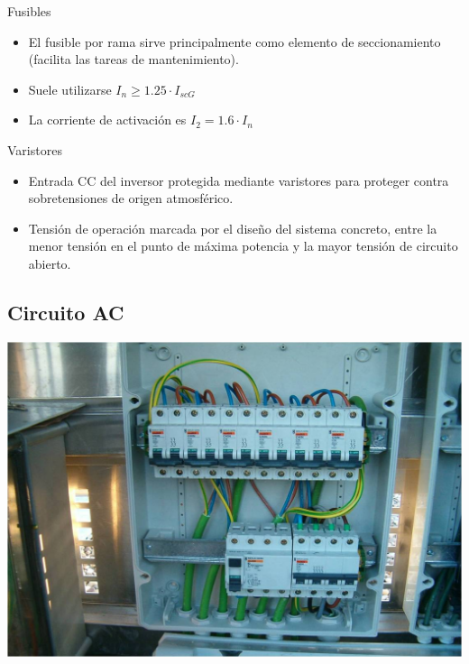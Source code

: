 \documentclass[xcolor={usenames,svgnames,dvipsnames}]{beamer}
\begin{document}
\begin{frame}[label={sec:orgc6a8b85}]{Fusibles}
\begin{itemize}
\item El \alert{fusible por rama} sirve principalmente como \alert{elemento de
seccionamiento} (facilita las tareas de mantenimiento).

\item Suele utilizarse \(I_{n} \geq 1.25\cdot I_{scG}\)

\item La corriente de activación es \(I_{2}=1.6\cdot I_{n}\)
\end{itemize}
\end{frame}

\begin{frame}[label={sec:org33e39ef}]{Varistores}
\begin{itemize}
\item Entrada CC del inversor protegida mediante \alert{varistores} para
proteger contra sobretensiones de origen atmosférico.

\item Tensión de operación marcada por el diseño del sistema concreto,
entre la menor tensión en el punto de máxima potencia y la mayor
tensión de circuito abierto.
\end{itemize}
\end{frame}


\subsection{Circuito AC}
\label{sec:orga55c20b}
\begin{frame}[label={sec:org64c113c}]{}
\begin{center}
\includegraphics[width=.9\linewidth]{../figs/CajaAC.jpg}
\end{center}
\end{frame}
\end{document}

